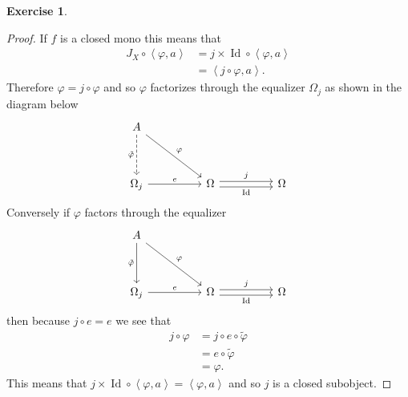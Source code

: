 \documentclass{article}
\DeclareMathOperator{\Id}{Id}
\newcommand{\gen}[1]{\left<#1\right>}
\theoremstyle{definition}
\newtheorem{question}{Exercise}
\begin{document}
\begin{question}
\begin{enumerate}[(a)]
\begin{proof}
                  If \(f\) is a closed mono this means that
                  \begin{align*}
                      J_{X}\circ\gen{\varphi,a} & =j\times\Id\circ\gen{\varphi,a} \\
                                                & =\gen{j\circ\varphi,a}.
                  \end{align*}
                  Therefore \(\varphi=j\circ\varphi\) and so \(\varphi\)
                  factorizes through the equalizer \(\Omega_{j}\) as shown in the
                  diagram below
                  \[
                      \begin{tikzcd}[ampersand replacement=\&]
                          A \\
                          \\
                          {\Omega_{j}} \&\& \Omega \&\& \Omega
                          \arrow["e", from=3-1, to=3-3]
                          \arrow["\Id"', shift right=1, from=3-3, to=3-5]
                          \arrow["j", shift left=1, from=3-3, to=3-5]
                          \arrow["\varphi", from=1-1, to=3-3]
                          \arrow["{\tilde{\varphi}}"', dashed, from=1-1, to=3-1]
                      \end{tikzcd}
                  \]
                  Conversely if \(\varphi\) factors through the equalizer
                  \[
                      \begin{tikzcd}[ampersand replacement=\&]
                          A \\
                          \\
                          {\Omega_{j}} \&\& \Omega \&\& \Omega
                          \arrow["e", from=3-1, to=3-3]
                          \arrow["\Id"', shift right=1, from=3-3, to=3-5]
                          \arrow["j", shift left=1, from=3-3, to=3-5]
                          \arrow["\varphi", from=1-1, to=3-3]
                          \arrow["{\tilde{\varphi}}"', from=1-1, to=3-1]
                      \end{tikzcd}
                  \]
                  then because \(j\circ e=e\) we see that
                  \begin{align*}
                      j\circ\varphi & =j\circ e\circ\tilde{\varphi} \\
                                    & =e\circ\tilde{\varphi}        \\
                                    & =\varphi.
                  \end{align*}
                  This means that
                  \(j\times\Id\circ\gen{\varphi,a}=\gen{\varphi,a}\) and so
                  \(j\) is a closed subobject.
              \end{proof}


\end{enumerate}
\end{question}
\end{document}
